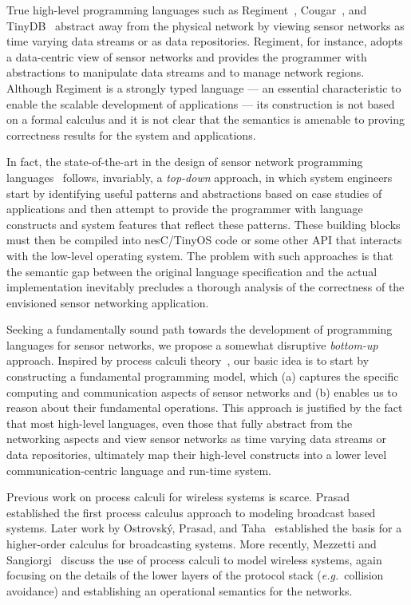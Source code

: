 \documentclass[copyright,creativecommons]{eptcs}
\begin{document}
True high-level programming languages such as Regiment~\cite{regiment},
Cougar~\cite{cougar}, and TinyDB~\cite{tinydb} abstract away from the
physical network by viewing sensor networks as time varying data
streams or as data repositories. 
Regiment, for instance, adopts a data-centric view of sensor networks
and provides the programmer with abstractions to manipulate data
streams and to manage network regions.
Although Regiment is a strongly typed language --- an essential
characteristic to enable the scalable development of applications
--- its construction is not based on a formal calculus and it is not
clear that the semantics is amenable to proving correctness results
for the system and applications.

In fact, the state-of-the-art in the design of sensor network
programming languages~\cite{bookchapter} follows, invariably, a
\emph{top-down} approach, in which system engineers start by
identifying useful patterns and abstractions based on case studies of
applications and then attempt to provide the programmer with language
constructs and system features that reflect these patterns.  These
building blocks must then be compiled into nesC/TinyOS code or some
other API that interacts with the low-level operating system.
The problem with such approaches is that the semantic gap between
the original language specification and the actual implementation
inevitably precludes a thorough analysis of the correctness of
the envisioned sensor networking application.

Seeking a fundamentally sound path towards the development of
programming languages for sensor networks, we propose
a somewhat disruptive \emph{bottom-up} approach.
Inspired by process calculi
theory~\cite{async-pi:honda:tokoro:91,pi:milner:parrow:walker:92}, our
basic idea is to start by constructing a fundamental programming
model, which (a) captures the specific computing and communication
aspects of sensor networks and (b) enables us to reason about their
fundamental operations.
This approach is justified by the fact that most high-level languages,
even those that fully abstract from the networking aspects and view
sensor networks as time varying data streams or data repositories,
ultimately map their high-level constructs into a lower level
communication-centric language and run-time system.

Previous work on process calculi for wireless systems is scarce.
Prasad~\cite{broadcast:prasad:91} established the first process
calculus approach to modeling broadcast based systems.
Later work by Ostrovsk\'y, Prasad, and
Taha~\cite{broadcast-high-order:ostrovsky:prasad:taha:02} established
the basis for a higher-order calculus for broadcasting systems.
More recently, Mezzetti and
Sangiorgi~\cite{wireless:mezzetti:sangiorgi:06} discuss the use of
process calculi to model wireless systems, again focusing on the
details of the lower layers of the protocol stack
(\emph{e.g.\@}~collision avoidance) and establishing an operational
semantics for the networks.
\end{document}

